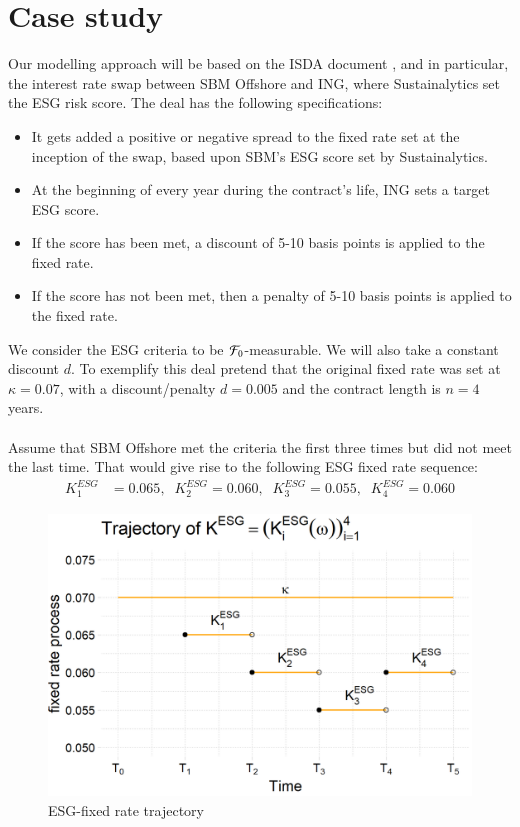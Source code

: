 \section{Case study}
Our modelling approach will be based on the ISDA document \cite{ISDA:2021}, and in particular, the interest rate swap between SBM Offshore and ING, where Sustainalytics set the ESG risk score. The deal has the following specifications:
\begin{itemize}
    \item It gets added a positive or negative spread to the fixed rate set at the inception of the swap, based upon SBM's ESG score set by Sustainalytics. 
    \item At the beginning of every year during the contract's life, ING sets a target ESG score.
    \item If the score has been met, a discount of 5-10 basis points is applied to the fixed rate.
    \item If the score has not been met, then a penalty of 5-10 basis points is applied to the fixed rate. 
\end{itemize} 

We consider the ESG criteria to be $\mathcal{F}_{0}$-measurable. We will also take a constant discount $d$. To exemplify this deal pretend that the original fixed rate was set at $\kappa = 0.07$, with a discount/penalty $d = 0.005$ and the contract length is $n=4$ years. 
\\~\\
Assume that SBM Offshore met the criteria the first three times but did not meet the last time. That would give rise to the following ESG fixed rate sequence: 
\begin{align*}
K_{1}^{ESG} &=  0.065, \;\; 
K_{2}^{ESG} =   0.060, \;\;
K_{3}^{ESG} =   0.055, \;\; 
K_{4}^{ESG} =   0.060
\end{align*}


\begin{figure}[htp]
    \centering
    \includegraphics[width=12cm]{figures/ESG/SBM_ESG_path.png}
    \caption{ESG-fixed rate trajectory}
    \label{fig: SBM_ESG_path}
\end{figure}


